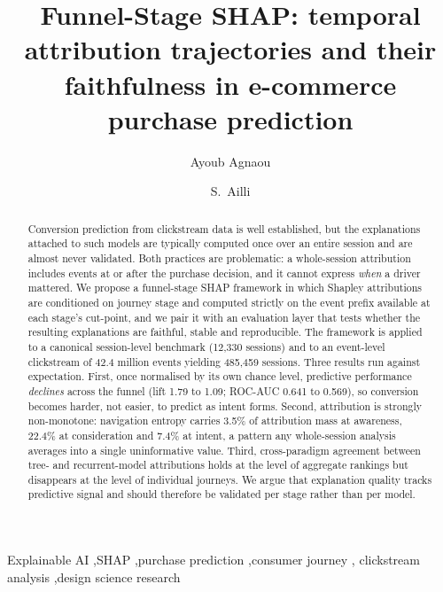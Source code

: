 \documentclass[review,3p,times,authoryear]{elsarticle}   %
\begin{document}
\begin{frontmatter}

\title{Funnel-Stage SHAP: temporal attribution trajectories and their
       faithfulness in e-commerce purchase prediction}

\author[a]{Ayoub Agnaou}
\author[a]{S.~Ailli}

\begin{abstract}
Conversion prediction from clickstream data is well established, but the
explanations attached to such models are typically computed once over an entire
session and are almost never validated. Both practices are problematic: a
whole-session attribution includes events at or after the purchase decision, and
it cannot express \emph{when} a driver mattered. We propose a funnel-stage SHAP
framework in which Shapley attributions are conditioned on journey stage and
computed strictly on the event prefix available at each stage's cut-point, and we
pair it with an evaluation layer that tests whether the resulting explanations are
faithful, stable and reproducible. The framework is applied to a canonical
session-level benchmark (12,330 sessions) and to an event-level clickstream of
42.4 million events yielding 485,459 sessions. Three results run against
expectation. First, once normalised by its own chance level, predictive
performance \emph{declines} across the funnel (lift 1.79 to 1.09; ROC-AUC 0.641 to
0.569), so conversion becomes harder, not easier, to predict as intent forms.
Second, attribution is strongly non-monotone: navigation entropy carries 3.5\% of
attribution mass at awareness, 22.4\% at consideration and 7.4\% at intent, a
pattern any whole-session analysis averages into a single uninformative value.
Third, cross-paradigm agreement between tree- and recurrent-model attributions
holds at the level of aggregate rankings but disappears at the level of individual
journeys. We argue that explanation quality tracks predictive signal and should
therefore be validated per stage rather than per model.
\end{abstract}

\begin{keyword}
Explainable AI \sep SHAP \sep purchase prediction \sep consumer journey \sep
clickstream analysis \sep design science research
\end{keyword}

\end{frontmatter}
\end{document}
